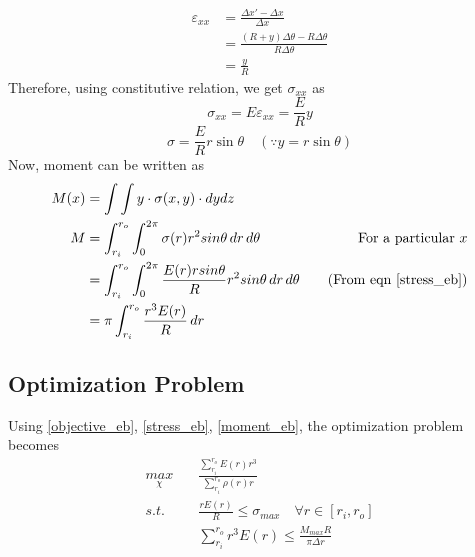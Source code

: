 \documentclass[10pt]{article}
\begin{document}
\begin{equation}
\begin{split}
\varepsilon_{xx} &= \frac{\Delta x' - \Delta x}{\Delta x}\\
&= \frac{(R+y)\Delta\theta - R\Delta\theta}{R\Delta\theta}\\
&= \frac{y}{R}
\end{split}
\end{equation}
Therefore, using constitutive relation, we get $\sigma_{xx}$ as
\begin{equation}
\sigma_{xx} = E\varepsilon_{xx} = \frac{E}{R}y
\end{equation}
\begin{equation}\label{stress_eb}
\sigma = \frac{E}{R}r\sin\theta \quad (\because y = r\sin\theta)
\end{equation}
Now, moment can be written as
\begin{equation}\label{moment_eb}
\begin{split}
M(x) &= \int\int y\cdot\sigma(x,y)\cdot dydz\\
M &= \int_{r_i}^{r_o}\int_0^{2\pi}\sigma(r)r^2 sin\theta\,dr\,d\theta & \text{For a particular $x$}\\
&=\int_{r_i}^{r_o}\int_0^{2\pi} \frac{E(r)r sin\theta}{R}r^2 sin\theta\,dr\,d\theta &\quad (\text{From eqn }\eqref{stress_eb})\\
&=\pi\int_{r_i}^{r_o}\frac{r^3 E(r)}{R}\,dr
\end{split}
\end{equation}
\subsection{Optimization Problem}
Using \eqref{objective_eb}, \eqref{stress_eb}, \eqref{moment_eb}, the optimization problem becomes
\begin{equation}
\begin{split}
\underset{\chi}{max} \quad& \frac{\sum^{r_o}_{r_i}E(r)r^3}{\sum^{r_o}_{r_i}\rho(r)r}\\
s.t. \quad& \frac{rE(r)}{R}\leq \sigma_{max} \quad \forall r \in [r_i, r_o]\\
& \sum_{r_i}^{r_o}r^3E(r)\leq \frac{M_{max}R}{\pi\Delta r}
\end{split}
\end{equation}
\end{document}
